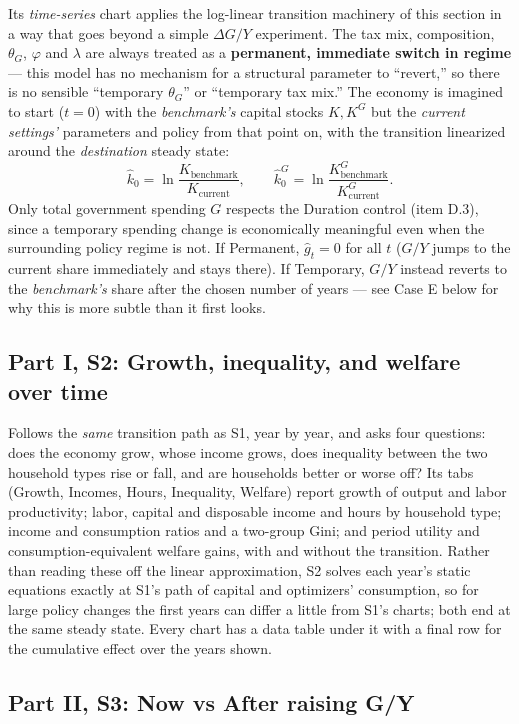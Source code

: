 \documentclass[11pt]{article}
\newcommand{\eq}[1]{\begin{equation}#1\end{equation}}
\begin{document}
Its \emph{time-series} chart applies the log-linear transition machinery
of this section in a way that goes beyond a simple $\Delta G/Y$
experiment. The tax mix, composition, $\theta_G$, $\varphi$ and $\lambda$
are always treated as a \textbf{permanent, immediate switch in regime} ---
this model has no mechanism for a structural parameter to ``revert,'' so
there is no sensible ``temporary $\theta_G$'' or ``temporary tax mix.'' The
economy is imagined to start ($t=0$) with the \emph{benchmark's} capital
stocks $K,K^G$ but the \emph{current settings'} parameters and policy from
that point on, with the transition linearized around the
\emph{destination} steady state:
\eq{ \hat k_0 = \ln\!\frac{K_{\text{benchmark}}}{K_{\text{current}}}, \qquad \hat{k}^G_0 = \ln\!\frac{K^G_{\text{benchmark}}}{K^G_{\text{current}}}. }
Only total government spending $G$ respects the Duration control (item
D.3), since a temporary spending change is economically meaningful even
when the surrounding policy regime is not. If Permanent, $\hat g_t=0$ for
all $t$ ($G/Y$ jumps to the current share immediately and stays there). If
Temporary, $G/Y$ instead reverts to the \emph{benchmark's} share after the
chosen number of years --- see Case E below for why this is more subtle
than it first looks.

\subsection{Part I, S2: Growth, inequality, and welfare over time}

Follows the \emph{same} transition path as S1, year by year, and asks four
questions: does the economy grow, whose income grows, does inequality
between the two household types rise or fall, and are households better
or worse off? Its tabs (Growth, Incomes, Hours, Inequality, Welfare) report
growth of output and labor productivity; labor, capital and disposable
income and hours by household type; income and consumption ratios and a
two-group Gini; and period utility and consumption-equivalent welfare
gains, with and without the transition. Rather than reading these off the
linear approximation, S2 solves each year's static equations exactly at
S1's path of capital and optimizers' consumption, so for large policy
changes the first years can differ a little from S1's charts; both end at
the same steady state. Every chart has a data table under it with a final
row for the cumulative effect over the years shown.

\subsection{Part II, S3: Now vs After raising G/Y}
\end{document}
